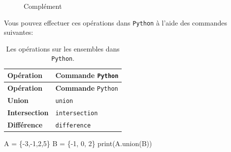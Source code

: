 \documentclass[
  letterpaper,
]{scrbook}
\newenvironment{Shaded}{\begin{snugshade}}{\end{snugshade}}
\newcommand{\BuiltInTok}[1]{\textcolor[rgb]{0.00,0.50,0.00}{#1}}
\newcommand{\DecValTok}[1]{\textcolor[rgb]{0.25,0.63,0.44}{#1}}
\newcommand{\NormalTok}[1]{\textcolor[rgb]{0.00,0.44,0.13}{#1}}
\newcommand{\OperatorTok}[1]{\textcolor[rgb]{0.40,0.40,0.40}{#1}}
\theoremstyle{plain}
\theoremstyle{definition}
\theoremstyle{definition}
\theoremstyle{remark}
\begin{document}
\begin{figure}
\begin{minipage}[t]{0.50\linewidth}
{\centering 


\caption{Complément}

}

\end{minipage}%

\end{figure}

Vous pouvez effectuer ces opérations dans \texttt{Python} à l'aide des
commandes suivantes:

\hypertarget{tbl-operations-ensembles-python}{}
\begin{longtable}[]{@{}ll@{}}
\caption{\label{tbl-operations-ensembles-python}Les opérations sur les
ensembles dans \texttt{Python}.}\tabularnewline
\toprule\noalign{}
\textbf{Opération} & \textbf{Commande} \texttt{Python} \\
\midrule\noalign{}
\endfirsthead
\toprule\noalign{}
\textbf{Opération} & \textbf{Commande} \texttt{Python} \\
\midrule\noalign{}
\endhead
\bottomrule\noalign{}
\endlastfoot
\textbf{Union} & \texttt{union} \\
\textbf{Intersection} & \texttt{intersection} \\
\textbf{Différence} & \texttt{difference} \\
\end{longtable}

\hypertarget{union-python}{}
\begin{Shaded}
\begin{Highlighting}[]
\NormalTok{A }\OperatorTok{=}\NormalTok{ \{}\OperatorTok{{-}}\DecValTok{3}\NormalTok{,}\OperatorTok{{-}}\DecValTok{1}\NormalTok{,}\DecValTok{2}\NormalTok{,}\DecValTok{5}\NormalTok{\}}
\NormalTok{B }\OperatorTok{=}\NormalTok{ \{}\OperatorTok{{-}}\DecValTok{1}\NormalTok{, }\DecValTok{0}\NormalTok{, }\DecValTok{2}\NormalTok{\}}
\BuiltInTok{print}\NormalTok{(A.union(B))}
\end{Highlighting}
\end{Shaded}
\end{document}
